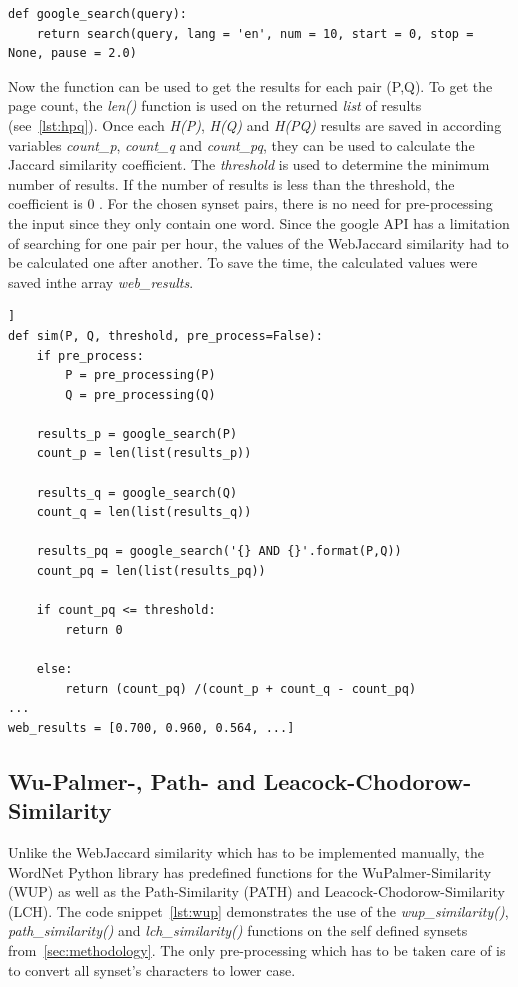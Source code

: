 \documentclass[conference]{IEEEtran}
\begin{document}
\begin{lstlisting}[frame=single, label=lst:googlesearch, caption={Google search function}, captionpos=b]
def google_search(query):
    return search(query, lang = 'en', num = 10, start = 0, stop = None, pause = 2.0)
\end{lstlisting}

Now the function can be used to get the results for each pair (P,Q). To get the page count, the \textit{len()} function is used on the returned \textit{list} of results (see~\ref{lst:hpq}). Once each \textit{H(P)}, \textit{H(Q)} and \textit{H(PQ)} results are saved in according variables \textit{count\_p}, \textit{count\_q} and \textit{count\_pq}, they can be used to calculate the Jaccard similarity coefficient. The \textit{threshold} is used to determine the minimum number of results. If the number of results is less than the threshold, the coefficient is 0 \cite{websim}. For the chosen synset pairs, there is no need for pre-processing the input since they only contain one word. Since the google API has a limitation of searching for one pair per hour, the values of the WebJaccard similarity had to be calculated one after another. To save the time, the calculated values were saved inthe array \textit{web\_results}.

\begin{lstlisting}[frame=single, label=lst:hpq, caption={Getting google results and calculation of WebJaccard similarity}, captionpos=b]]
def sim(P, Q, threshold, pre_process=False):
    if pre_process:
        P = pre_processing(P)
        Q = pre_processing(Q)

    results_p = google_search(P)
    count_p = len(list(results_p))

    results_q = google_search(Q)
    count_q = len(list(results_q))
    
    results_pq = google_search('{} AND {}'.format(P,Q))
    count_pq = len(list(results_pq))
    
    if count_pq <= threshold:
        return 0
    
    else:
        return (count_pq) /(count_p + count_q - count_pq)
...
web_results = [0.700, 0.960, 0.564, ...]
\end{lstlisting}

\subsection{Wu-Palmer-, Path- and Leacock-Chodorow-Similarity}\label{subsec:wup}
Unlike the WebJaccard similarity which has to be implemented manually, the WordNet Python library has predefined functions for the WuPalmer-Similarity (WUP) as well as the Path-Similarity (PATH) and Leacock-Chodorow-Similarity (LCH). The code snippet~\ref{lst:wup} demonstrates the use of the \textit{wup\_similarity()}, \textit{path\_similarity()} and \textit{lch\_similarity()} functions on the self defined synsets from~\ref{sec:methodology}. The only pre-processing which has to be taken care of is to convert all synset's characters to lower case.
\end{document}
